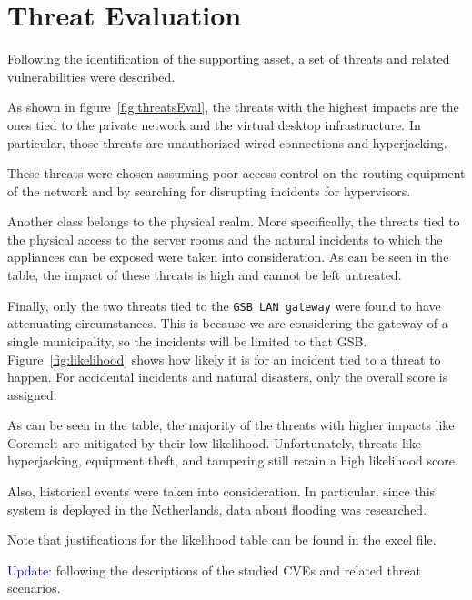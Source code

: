 \section*{Threat Evaluation}

Following the identification of the supporting asset, a set of threats and related vulnerabilities were described. 

As shown in figure~\ref{fig:threatsEval}, the threats with the highest impacts are the ones tied to the private network and the virtual desktop infrastructure. In particular, those threats are unauthorized wired connections and hyperjacking\cite{online:hyperjacking}.

These threats were chosen assuming poor access control on the routing equipment of the network and by searching for disrupting incidents for hypervisors. 

Another class belongs to the physical realm. More specifically, the threats tied to the physical access to the server rooms and the natural incidents to which the appliances can be exposed were taken into consideration. As can be seen in the table, the impact of these threats is high and cannot be left untreated.

Finally, only the two threats tied to the \texttt{GSB LAN gateway} were found to have attenuating circumstances. This is because we are considering the gateway of a single municipality, so the incidents will be limited to that GSB.\\

Figure~\ref{fig:likelihood} shows how likely it is for an incident tied to a threat to happen. For accidental incidents and natural disasters, only the overall score is assigned.

As can be seen in the table, the majority of the threats with higher impacts like Coremelt are mitigated by their low likelihood. Unfortunately, threats like hyperjacking, equipment theft, and tampering still retain a high likelihood score.

Also, historical events were taken into consideration. In particular, since this system is deployed in the Netherlands, data about flooding was researched\cite{online:flooding}.

Note that justifications for the likelihood table can be found in the excel file.

\noindent \textcolor{blue}{Update:} following the descriptions of the studied CVEs and related threat scenarios. 

